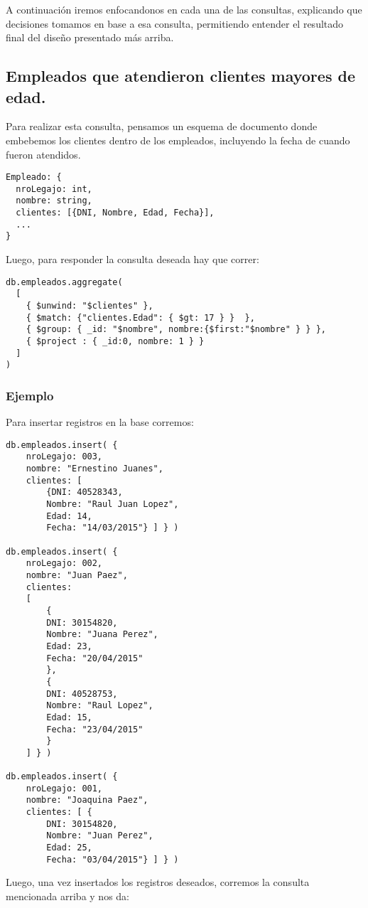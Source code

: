 A continuación iremos enfocandonos en cada una de las consultas, explicando que decisiones tomamos en base a esa consulta, permitiendo entender el resultado final del diseño presentado más arriba.


\subsection{Empleados que atendieron clientes mayores de edad.}

Para realizar esta consulta, pensamos un esquema de documento donde embebemos los clientes dentro de los empleados, incluyendo la fecha de cuando fueron atendidos.

\begin{lstlisting}
Empleado: {
  nroLegajo: int,
  nombre: string,
  clientes: [{DNI, Nombre, Edad, Fecha}],
  ...
}
\end{lstlisting}

Luego, para responder la consulta deseada hay que correr:

\begin{lstlisting}
db.empleados.aggregate(
  [
    { $unwind: "$clientes" },
    { $match: {"clientes.Edad": { $gt: 17 } }  },
    { $group: { _id: "$nombre", nombre:{$first:"$nombre" } } },
    { $project : { _id:0, nombre: 1 } }
  ]
)
\end{lstlisting}
\label{consulta-a}

\subsubsection{Ejemplo}

Para insertar registros en la base corremos:

\begin{lstlisting}
db.empleados.insert( {
	nroLegajo: 003,
	nombre: "Ernestino Juanes",
	clientes: [
		{DNI: 40528343,
		Nombre: "Raul Juan Lopez",
		Edad: 14,
		Fecha: "14/03/2015"} ] } )

db.empleados.insert( {
	nroLegajo: 002,
	nombre: "Juan Paez",
	clientes:
	[
		{
		DNI: 30154820,
		Nombre: "Juana Perez",
		Edad: 23,
		Fecha: "20/04/2015"
		},
		{
		DNI: 40528753,
		Nombre: "Raul Lopez",
		Edad: 15,
		Fecha: "23/04/2015"
		}
	] } )

db.empleados.insert( {
	nroLegajo: 001,
	nombre: "Joaquina Paez",
	clientes: [ {
		DNI: 30154820,
		Nombre: "Juan Perez",
		Edad: 25,
		Fecha: "03/04/2015"} ] } )
\end{lstlisting}

Luego, una vez insertados los registros deseados, corremos la consulta mencionada arriba y nos da:

